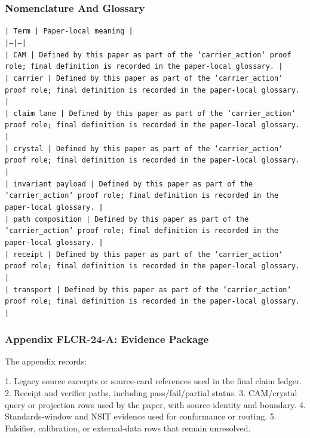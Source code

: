 \documentclass[11pt]{article}
\begin{document}
\subsubsection*{Nomenclature And Glossary}

\noindent\texttt{| Term | Paper-local meaning |}\\
\noindent\texttt{|---|---|}\\
\noindent\texttt{| CAM | Defined by this paper as part of the `carrier\_action` proof role; final definition is recorded in the paper-local glossary. |}\\
\noindent\texttt{| carrier | Defined by this paper as part of the `carrier\_action` proof role; final definition is recorded in the paper-local glossary. |}\\
\noindent\texttt{| claim lane | Defined by this paper as part of the `carrier\_action` proof role; final definition is recorded in the paper-local glossary. |}\\
\noindent\texttt{| crystal | Defined by this paper as part of the `carrier\_action` proof role; final definition is recorded in the paper-local glossary. |}\\
\noindent\texttt{| invariant payload | Defined by this paper as part of the `carrier\_action` proof role; final definition is recorded in the paper-local glossary. |}\\
\noindent\texttt{| path composition | Defined by this paper as part of the `carrier\_action` proof role; final definition is recorded in the paper-local glossary. |}\\
\noindent\texttt{| receipt | Defined by this paper as part of the `carrier\_action` proof role; final definition is recorded in the paper-local glossary. |}\\
\noindent\texttt{| transport | Defined by this paper as part of the `carrier\_action` proof role; final definition is recorded in the paper-local glossary. |}\\

\subsubsection*{Appendix FLCR-24-A: Evidence Package}

The appendix records:

1. Legacy source excerpts or source-card references used in the final claim ledger.
2. Receipt and verifier paths, including pass/fail/partial status.
3. CAM/crystal query or projection rows used by the paper, with source identity and boundary.
4. Standards-window and NSIT evidence used for conformance or routing.
5. Falsifier, calibration, or external-data rows that remain unresolved.
\end{document}
